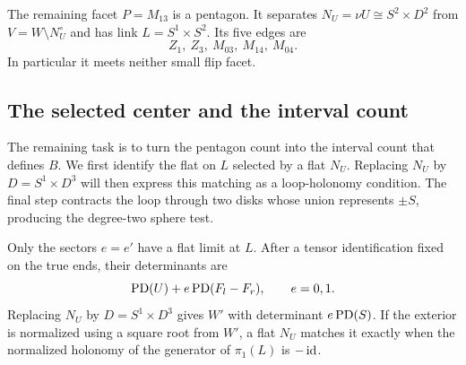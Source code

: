 The remaining facet $P=M_{13}$ is a pentagon.  It separates
$N_U=\nu U\cong S^2\times D^2$ from $V=W\setminus N_U^\circ$ and
has link $L=S^1\times S^2$.  Its five edges are
\begin{equation}\label{eq:negative:pentagon-edges}
 Z_1,\ Z_3,\ M_{03},\ M_{14},\ M_{04}.
\end{equation}
In particular it meets neither small flip facet.

\subsection{The selected center and the interval count}

The remaining task is to turn the pentagon count into the interval count
that defines $B$.  We first identify the flat on $L$ selected by a flat
$N_U$.  Replacing $N_U$ by $D=S^1\times D^3$ will then express this
matching as a loop-holonomy condition.  The final step contracts the loop
through two disks whose union represents $\pm S$, producing the
degree-two sphere test.

\begin{lemma}
\label{lem:negative:root}
Only the sectors $e=e'$ have a flat limit at $L$.  After a tensor
identification fixed on the true ends, their determinants are
\begin{equation}\label{eq:negative:surviving-determinant}
 \operatorname{PD}(U)+e\operatorname{PD}(F_l-F_r),\qquad e=0,1.
\end{equation}
Replacing $N_U$ by $D=S^1\times D^3$ gives $W'$ with determinant
$e\operatorname{PD}(S)$.  If the exterior is normalized using a square root from
$W'$, a flat $N_U$ matches it exactly when the normalized holonomy
of the generator of $\pi_1(L)$ is $-\operatorname{id}$.
\end{lemma}

